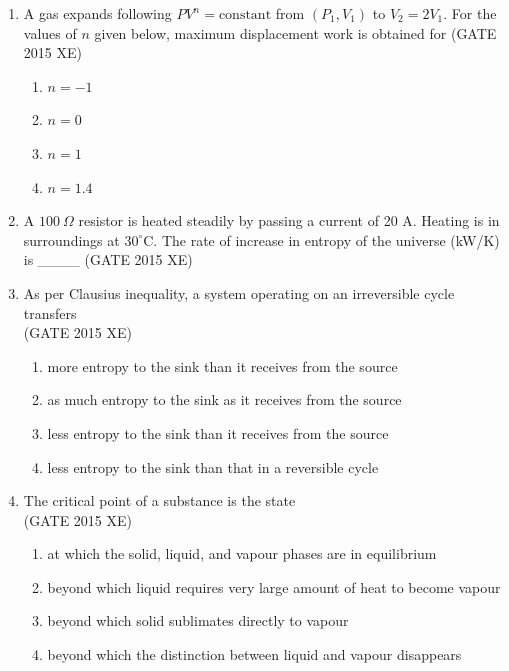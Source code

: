 \documentclass[journal,12pt,onecolumn]{IEEEtran}
\begin{document}
\begin{enumerate}

\item A gas expands following $PV^n = \text{constant}$ from $(P_1,V_1)$ to $V_2 = 2V_1$. For the values of $n$ given below, maximum displacement work is obtained for  
\hfill{(GATE 2015 XE)} \\
\begin{multicols}{4}
\begin{enumerate}
\item $n = -1$
\item $n = 0$
\item $n = 1$
\item $n = 1.4$
\end{enumerate}
\end{multicols}

\item A $100\ \Omega$ resistor is heated steadily by passing a current of 20 A. Heating is in surroundings at $30^\circ$C. The rate of increase in entropy of the universe (kW/K) is \_\_\_\_
\hfill{(GATE 2015 XE)} \\


\item As per Clausius inequality, a system operating on an irreversible cycle transfers \\
\hfill{(GATE 2015 XE)} 
\begin{multicols}{2}
\begin{enumerate}
\item more entropy to the sink than it receives from the source
\item as much entropy to the sink as it receives from the source
\item less entropy to the sink than it receives from the source
\item less entropy to the sink than that in a reversible cycle
\end{enumerate}
\end{multicols}

\item The critical point of a substance is the state  \\
\hfill{(GATE 2015 XE)} 
\begin{multicols}{2}
\begin{enumerate}
\item at which the solid, liquid, and vapour phases are in equilibrium
\item beyond which liquid requires very large amount of heat to become vapour
\item beyond which solid sublimates directly to vapour
\item beyond which the distinction between liquid and vapour disappears
\end{enumerate}
\end{multicols}


\end{enumerate}
\end{document}
